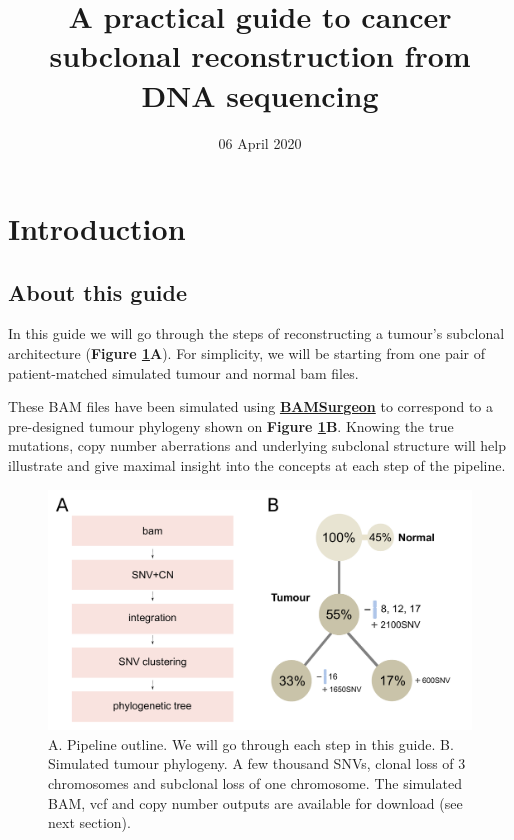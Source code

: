 \documentclass[]{article}
\title{A practical guide to cancer subclonal reconstruction from DNA sequencing}
\author{}
\date{06 April 2020}
\begin{document}
\maketitle

{
\setcounter{tocdepth}{2}
\tableofcontents
}
\newpage

\hypertarget{introduction}{%
\section{Introduction}\label{introduction}}

\hypertarget{about-this-guide}{%
\subsection{About this guide}\label{about-this-guide}}

In this guide we will go through the steps of reconstructing a tumour's
subclonal architecture (\textbf{Figure \ref{Figure1}A}). For simplicity,
we will be starting from one pair of patient-matched simulated tumour
and normal bam files.

These BAM files have been simulated using
\href{https://github.com/adamewing/bamsurgeon}{\textbf{BAMSurgeon}} to
correspond to a pre-designed tumour phylogeny shown on
\textbf{Figure \ref{Figure1}B}. Knowing the true mutations, copy number
aberrations and underlying subclonal structure will help illustrate and
give maximal insight into the concepts at each step of the pipeline.

\begin{figure}[H]
  \centering
  \includegraphics{figures/fig1_pipelineOutline.pdf}
  \caption{A. Pipeline outline. We will go through each step in this
  guide. B. Simulated tumour phylogeny. A few thousand SNVs, clonal
  loss of 3 chromosomes and subclonal loss of one chromosome. 
  The simulated BAM, vcf and copy number outputs are available
  for download (see next section).}
  \label{Figure1}
\end{figure}
\end{document}
